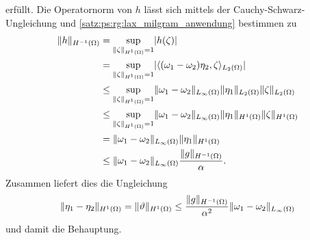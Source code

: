\begin{Lemma}
\begin{Beweis}
\begin{equation}
        \end{equation}
        erfüllt.
        Die Operatornorm von $h$ lässt sich mittels der Cauchy-Schwarz-Ungleichung und \cref{satz:ps:rg:lax_milgram_anwendung} bestimmen zu
        \begin{equation}
            \begin{aligned}
                \lVert h\rVert_{H^{-1}(\Omega)}
                  &=    \sup_{\lVert\zeta\rVert_{H^{1}(\Omega)} = 1} \lvert h(\zeta)\rvert
                \\&=    \sup_{\lVert\zeta\rVert_{H^{1}(\Omega)} = 1} \lvert\langle(\omega_{1} - \omega_{2}) \eta_{2},\zeta\rangle_{L_{2}(\Omega)}\rvert
                \\&\leq \sup_{\lVert\zeta\rVert_{H^{1}(\Omega)} = 1} \lVert\omega_{1} - \omega_{2}\rVert_{L_{\infty}(\Omega)} \lVert\eta_{1}\rVert_{L_{2}(\Omega)} \lVert\zeta\rVert_{L_{2}(\Omega)}
                \\&\leq \sup_{\lVert\zeta\rVert_{H^{1}(\Omega)} = 1} \lVert\omega_{1} - \omega_{2}\rVert_{L_{\infty}(\Omega)} \lVert\eta_{1}\rVert_{H^{1}(\Omega)} \lVert\zeta\rVert_{H^{1}(\Omega)}
                \\&=    \lVert\omega_{1} - \omega_{2}\rVert_{L_{\infty}(\Omega)} \lVert\eta_{1}\rVert_{H^{1}(\Omega)}
                \\&\leq \lVert\omega_{1} - \omega_{2}\rVert_{L_{\infty}(\Omega)} \frac{\lVert g\rVert_{H^{-1}(\Omega)}}{\alpha}.
            \end{aligned}
        \end{equation}
        Zusammen liefert dies die Ungleichung
        \begin{equation}
            \lVert\eta_{1} - \eta_{2}\rVert_{H^{1}(\Omega)}
            = \lVert\vartheta\rVert_{H^{1}(\Omega)} \leq \frac{\lVert g\rVert_{H^{-1}(\Omega)}}{\alpha^{2}} \lVert\omega_{1} - \omega_{2}\rVert_{L_{\infty}(\Omega)}
        \end{equation}
        und damit die Behauptung.
    \end{Beweis}
\end{Lemma}

